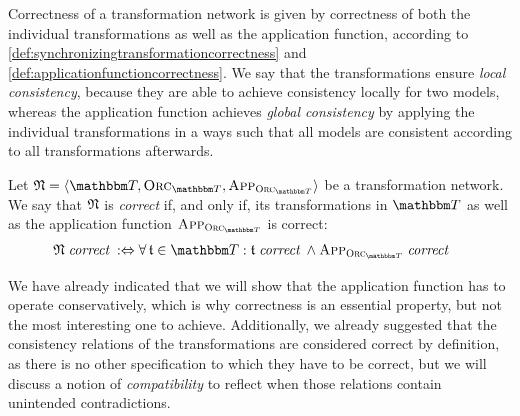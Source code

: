 Correctness of a transformation network is given by correctness of both the individual transformations as well as the application function, according to \autoref{def:synchronizingtransformationcorrectness} and \autoref{def:applicationfunctioncorrectness}.
We say that the transformations ensure \emph{local consistency}, because they are able to achieve consistency locally for two models, whereas the application function achieves \emph{global consistency} by applying the individual transformations in a ways such that all models are consistent according to all transformations afterwards.

\begin{definition}
    \label{def:transformationnetworkcorrectness}
    Let $\transformationnetwork{N} = \tupled{\transformationset{T}, \orcfunction{\transformationset{T}}, \appfunction{\orcfunction{\transformationset{T}}}}$ be a transformation network.
    We say that $\mathfrak{N}$ is \emph{correct} if, and only if, its transformations in $\transformationset{T}$ as well as the application function $\appfunction{\orcfunction{\transformationset{T}}}$ is correct:
    \begin{align*}
        & 
       \transformationnetwork{N} \correctmath \equivalentperdefinition %
        \forall \transformation{t} \in \transformationset{T} : \transformation{t} \correctmath \land \appfunction{\orcfunction{\transformationset{T}}} \correctmath
    \end{align*}
\end{definition}

We have already indicated that we will show that the application function has to operate conservatively, which is why correctness is an essential property, but not the most interesting one to achieve.
Additionally, we already suggested that the consistency relations of the transformations are considered correct by definition, as there is no other specification to which they have to be correct, but we will discuss a notion of \emph{compatibility} to reflect when those relations contain unintended contradictions.



